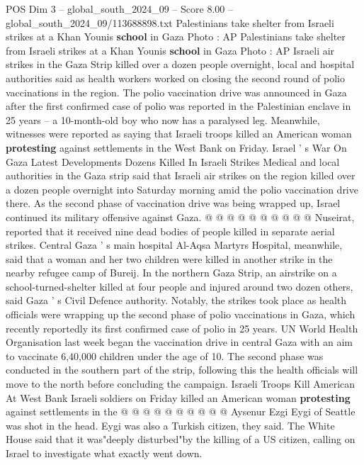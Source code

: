 \begin{textsample}{POS Dim 3 – global\_south\_2024\_09 – Score 8.00 – global\_south\_2024\_09/113688898.txt}  \label{ex:f3_pos_325}
Palestinians take shelter from Israeli strikes at a Khan Younis \textbf{school} in Gaza Photo : AP Palestinians take shelter from Israeli strikes at a Khan Younis \textbf{school} in Gaza Photo : AP Israeli air strikes in the Gaza Strip killed over a dozen people overnight, local and hospital authorities said as health workers worked on closing the second round of polio vaccinations in the region.
The polio vaccination drive was announced in Gaza after the first confirmed case of polio was reported in the Palestinian enclave in 25 years -- a 10-month-old boy who now has a paralysed leg.
Meanwhile, witnesses were reported as saying that Israeli troops killed an American woman \textbf{protesting} against settlements in the West Bank on Friday.
Israel ' s War On Gaza Latest Developments Dozens Killed In Israeli Strikes Medical and local authorities in the Gaza strip said that Israeli air strikes on the region killed over a dozen people overnight into Saturday morning amid the polio vaccination drive there.
As the second phase of vaccination drive was being wrapped up, Israel continued its military offensive against Gaza. @ @ @ @ @ @ @ @ @ @ Nuseirat, reported that it received nine dead bodies of people killed in separate aerial strikes.
Central Gaza ' s main hospital Al-Aqsa Martyrs Hospital, meanwhile, said that a woman and her two children were killed in another strike in the nearby refugee camp of Bureij.
In the northern Gaza Strip, an airstrike on a school-turned-shelter killed at four people and injured around two dozen others, said Gaza ' s Civil Defence authority.
Notably, the strikes took place as health officials were wrapping up the second phase of polio vaccinations in Gaza, which recently reportedly its first confirmed case of polio in 25 years.
UN World Health Organisation last week began the vaccination drive in central Gaza with an aim to vaccinate 6,40,000 children under the age of 10.
The second phase was conducted in the southern part of the strip, following this the health officials will move to the north before concluding the campaign.
Israeli Troops Kill American At West Bank Israeli soldiers on Friday killed an American woman \textbf{protesting} against settlements in the @ @ @ @ @ @ @ @ @ @ Aysenur Ezgi Eygi of Seattle was shot in the head.
Eygi was also a Turkish citizen, they said.
The White House said that it was"deeply disturbed"by the killing of a US citizen, calling on Israel to investigate what exactly went down.

\end{textsample}

